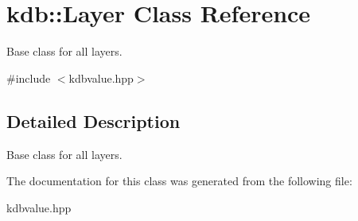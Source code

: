 \hypertarget{classkdb_1_1Layer}{\section{kdb\+:\+:Layer Class Reference}
\label{classkdb_1_1Layer}
}


Base class for all layers.  




{\ttfamily \#include $<$kdbvalue.\+hpp$>$}



\subsection{Detailed Description}
Base class for all layers. 

The documentation for this class was generated from the following file\+:\begin{DoxyCompactItemize}
\item 
kdbvalue.\+hpp\end{DoxyCompactItemize}
